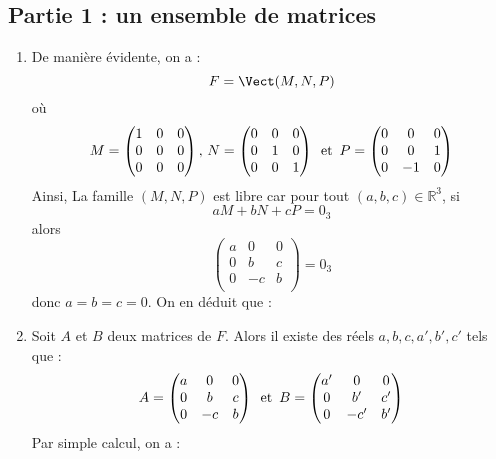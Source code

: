 \documentclass[a4paper,twoside,french,10pt]{VcCours}
\begin{document}
\subsection*{Partie 1 : un ensemble de matrices}
\begin{enumerate}
    \item De manière évidente, on a :
    $$ F = \Vect(M,N,P)$$
    où
    $$ M = \begin{pmatrix}
    1 & 0 & 0 \\
    0 & 0 & 0 \\
    0 & 0 & 0 \\
    \end{pmatrix}, \, N= \begin{pmatrix}
    0 & 0 & 0 \\
    0 & 1 & 0 \\
    0 & 0 & 1 \\
    \end{pmatrix} \, \hbox{ et } \, P = \begin{pmatrix}
    0 & 0 & 0 \\
    0 & 0 & 1 \\
    0 & -1 & 0 \\
    \end{pmatrix}$$
    Ainsi,
    La famille $(M,N,P)$ est libre car pour tout $(a,b,c) \in \mathbb{R}^3$, si 
    $$ aM+bN+cP = 0_3$$
    alors 
    $$ \begin{pmatrix}
    a & 0 & 0 \\
    0 & b & c \\
    0 & -c & b \\
    \end{pmatrix} = 0_3$$
    donc $a=b=c=0$. On en déduit que :
    \item Soit $A$ et $B$ deux matrices de $F$. Alors il existe des réels $a,b,c,a',b',c'$ tels que :
    $$ A= \begin{pmatrix}
    a & 0 & 0 \\
    0 & b & c \\
    0 & -c & b \\
    \end{pmatrix} \, \hbox{ et } \, B=\begin{pmatrix}
    a' & 0 & 0 \\
    0 & b' & c'\\
    0 & -c' & b' \\
    \end{pmatrix}$$
    Par simple calcul, on a :

\end{enumerate}
\end{document}
